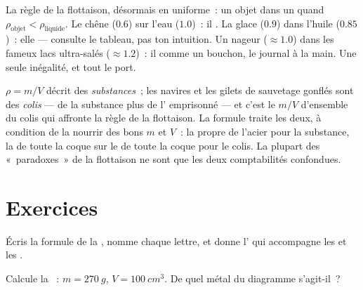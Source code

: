 \begin{example}\label{ex:g7:volume-mass-density:floating}
La règle de la flottaison, désormais en uniforme~: un objet 
dans un  quand
$\rho_{\text{objet}} < \rho_{\text{liquide}}$. Le chêne ($0.6$) sur
l'eau ($1.0$)~: il . La glace ($0.9$) dans l'huile ($0.85$)~:
elle  --- consulte le tableau, pas ton intuition. Un nageur
($\approx 1.0$) dans les fameux lacs ultra-salés ($\approx 1.2$)~: il
 comme un bouchon, le journal à la main. Une seule inégalité,
et tout le port.
\end{example}

\begin{remark}\label{rem:g7:volume-mass-density:parcel}
$\rho = m/V$ décrit des \emph{substances}~; les navires et les gilets
de sauvetage gonflés sont des \emph{colis} --- de la substance plus
de l' emprisonné --- et c'est le $m/V$ d'ensemble du colis qui
affronte la règle de la flottaison. La formule traite les deux, à
condition de la nourrir des bons $m$ et $V$~: la 
propre de l'acier pour la substance, la  de toute la coque sur
le  de toute la coque pour le colis. La plupart des
«~paradoxes~» de la flottaison ne sont que les deux comptabilités
confondues.
\end{remark}

\section{Exercices}

\begin{exercise}[$\star$]\label{exo:g7:volume-mass-density:1}
Écris la formule de la , nomme chaque lettre, et donne
l' qui accompagne les  et les .
\end{exercise}

\begin{exercise}[$\star$]\label{exo:g7:volume-mass-density:2}
Calcule la ~: $m = \qty{270}{g}$,
$V = \qty{100}{cm^3}$. De quel métal du diagramme s'agit-il~?
\end{exercise}


